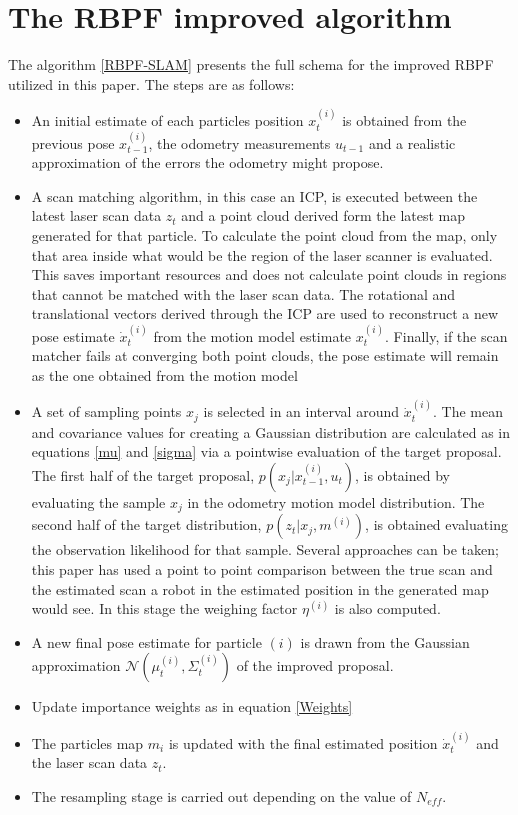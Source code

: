 \documentclass[letterpaper]{article}
\begin{document}
\section{The RBPF improved algorithm}
The algorithm \ref{RBPF-SLAM} presents the full schema for the improved RBPF utilized in this paper. The steps are as follows:
\begin{itemize}
	\item An initial estimate of each particles position $x_t^{(i)}$ is obtained from the previous pose $x_{t-1}^{(i)}$, the odometry measurements $u_{t-1}$ and a realistic approximation of the errors the odometry might propose.
	\item A scan matching algorithm, in this case an ICP, is executed between the latest laser scan data $z_t$ and a point cloud derived form the latest map generated for that particle. To calculate the point cloud from the map, only that area inside what would be the region of the laser scanner is evaluated. This saves important resources and does not calculate point clouds in regions that cannot be matched with the laser scan data. The rotational and translational vectors derived through the ICP are used to reconstruct a new pose estimate $\dot x_t^{(i)}$ from the motion model estimate $x_t^{(i)}$. Finally, if the scan matcher fails at converging both point clouds, the pose estimate will remain as the one obtained from the motion model
	\item A set of sampling points $x_j$ is selected in an interval around $\dot x_t^{(i)}$. The mean and covariance values for creating a Gaussian distribution are calculated as in equations \ref{mu} and \ref{sigma} via a pointwise evaluation of the target proposal. The first half of the target proposal,  $p(x_j|x_{t-1}^{(i)}, u_t)$, is obtained by evaluating the sample $x_j$ in the odometry motion model distribution. The second half of the target distribution, $p(z_t|x_j, m^{(i)})$, is obtained evaluating the observation likelihood for that sample. Several approaches can be taken; this paper has used a point to point comparison between the true scan and the estimated scan a robot in the estimated position in the generated map would see. In this stage the weighing factor $\eta^{(i)}$ is also computed. 
	\item A new final pose estimate for particle $(i)$ is drawn from the Gaussian approximation $\mathcal{N} (\mu_t^{(i)}, \Sigma_t^{(i)})$ of the improved proposal.
	\item Update importance weights as in equation \ref{Weights}
	\item The particles map $m_i$ is updated with the final estimated position $\dot x_t^{(i)}$ and the laser scan data $z_t$.
	\item The resampling stage is carried out depending on the value of $N_{eff}$.
\end{itemize}
\end{document}
